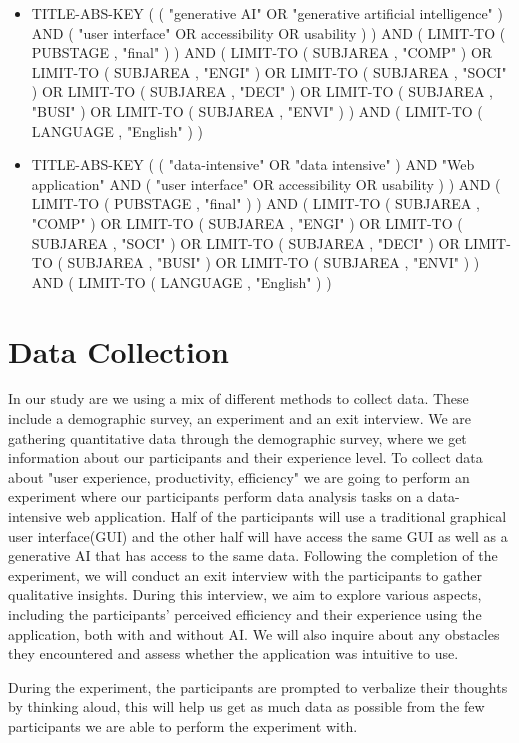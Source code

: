 \begin{itemize}
    \item TITLE-ABS-KEY ( ( "generative AI" OR "generative artificial intelligence" ) AND ( "user interface" OR accessibility OR usability ) ) AND ( LIMIT-TO ( PUBSTAGE , "final" ) ) AND ( LIMIT-TO ( SUBJAREA , "COMP" ) OR LIMIT-TO ( SUBJAREA , "ENGI" ) OR LIMIT-TO ( SUBJAREA , "SOCI" ) OR LIMIT-TO ( SUBJAREA , "DECI" ) OR LIMIT-TO ( SUBJAREA , "BUSI" ) OR LIMIT-TO ( SUBJAREA , "ENVI" ) ) AND ( LIMIT-TO ( LANGUAGE , "English" ) )

    \item TITLE-ABS-KEY ( ( "data-intensive" OR "data intensive" ) AND "Web application" AND ( "user interface" OR accessibility OR usability ) ) AND ( LIMIT-TO ( PUBSTAGE , "final" ) ) AND ( LIMIT-TO ( SUBJAREA , "COMP" ) OR LIMIT-TO ( SUBJAREA , "ENGI" ) OR LIMIT-TO ( SUBJAREA , "SOCI" ) OR LIMIT-TO ( SUBJAREA , "DECI" ) OR LIMIT-TO ( SUBJAREA , "BUSI" ) OR LIMIT-TO ( SUBJAREA , "ENVI" ) ) AND ( LIMIT-TO ( LANGUAGE , "English" ) )
\end{itemize}



\section{Data Collection}
In our study are we using a mix of different methods to collect data. These include a demographic survey, an experiment and an exit interview. We are gathering quantitative data through the demographic survey, where we get information about our participants and their experience level. To collect data about "user experience, productivity, efficiency" we are going to perform an experiment where our participants perform data analysis tasks on a data-intensive web application. Half of the participants will use a traditional graphical user interface(GUI) and the other half will have access the same GUI as well as a generative AI that has access to the same data.  Following the completion of the experiment, we will conduct an exit interview with the participants to gather qualitative insights. During this interview, we aim to explore various aspects, including the participants' perceived efficiency and their experience using the application, both with and without AI. We will also inquire about any obstacles they encountered and assess whether the application was intuitive to use. 

During the experiment, the participants are prompted to verbalize their thoughts by thinking aloud\cite{thinkingAloud}, this will help us get as much data as possible from the few participants we are able to perform the experiment with.

